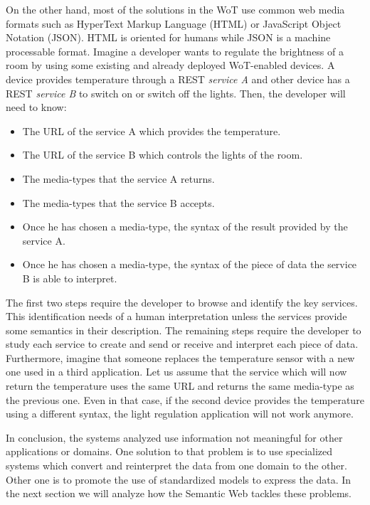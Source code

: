 \medskip

On the other hand, most of the solutions in the WoT use common web media formats such as HyperText Markup Language (HTML) or JavaScript Object Notation (JSON). %
HTML is oriented for humans while JSON is a machine processable format.
Imagine a developer wants to regulate the brightness of a room by using some existing and already deployed WoT-enabled devices.
A device provides temperature through a REST \emph{service A} and other device has a REST \emph{service B} to switch on or switch off the lights.
Then, the developer will need to know:
\begin{itemize}
 \item The URL of the service A which provides the temperature.
 \item The URL of the service B which controls the lights of the room.
 \item The media-types that the service A returns.
 \item The media-types that the service B accepts.
 \item Once he has chosen a media-type, the syntax of the result provided by the service A.
 \item Once he has chosen a media-type, the syntax of the piece of data the service B is able to interpret.
\end{itemize}

The first two steps require the developer to browse and identify the key services.
This identification needs of a human interpretation unless the services provide some semantics in their description. %
The remaining steps require the developer to study each service to create and send or receive and interpret each piece of data.
Furthermore, imagine that someone replaces the temperature sensor with a new one used in a third application.
Let us assume that the service which will now return the temperature uses the same URL and returns the same media-type as the previous one.
Even in that case, if the second device provides the temperature using a different syntax, the light regulation application will not work anymore.

\medskip

In conclusion, the systems analyzed use information not meaningful for other applications or domains.
One solution to that problem is to use specialized systems which convert and reinterpret the data from one domain to the other.
Other one is to promote the use of standardized models to express the data.
In the next section we will analyze how the Semantic Web tackles these problems.


